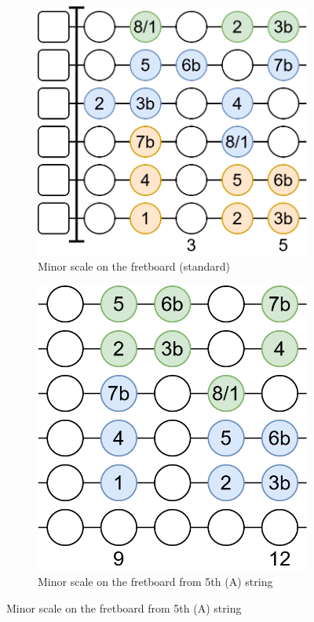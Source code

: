 \begin{figure}[h]
	\begin{subfigure}[b]{0.45\textwidth}
		\centering
		\includegraphics[height=0.175\textheight]{../../Images/guitar_minor_scale_standard.png}
		\caption{Minor scale on the fretboard (standard)}
		\label{fig:guitar_minor_scale_fretboard_standard}
	\end{subfigure}
	\hfill
	\begin{subfigure}[b]{0.45\textwidth}
		\centering
		\includegraphics[height=0.175\textheight]{../../Images/guitar_minor_scale_standard_start_5th_string.png}
		\caption{Minor scale on the fretboard from 5th (A) string}
		\label{fig:guitar_minor_scale_fretboard_standard_start_5th_string}
	\end{subfigure}
	

\end{figure}

